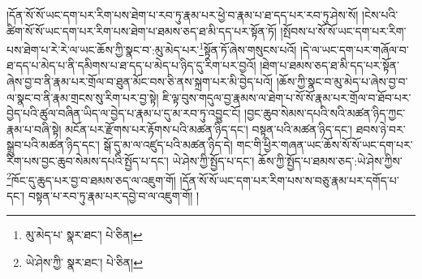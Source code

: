 །དོན་སོ་སོ་ཡང་དག་པར་རིག་པས་ཐེག་པ་རབ་ཏུ་རྣམ་པར་ཕྱེ་བ་རྣམ་པ་ཐ་དད་པར་རབ་ཏུ་ཤེས་སོ། །ངེས་པའི་ཚིག་སོ་སོ་ཡང་དག་པར་རིག་པས་ཐེག་པ་ཐམས་ཅད་ཐ་མི་དད་པར་སྟོན་ཏོ། །སྤོབས་པ་སོ་སོ་ཡང་དག་པར་རིག་པས་ཐེག་པ་རེ་རེ་ལ་ཡང་ཆོས་ཀྱི་སྣང་བ་:མུ་མེད་པར་\footnote{མུ་མེད་པ་  སྣར་ཐང་།  པེ་ཅིན། }སྟོན་ཏོ་ཞེས་གསུངས་པའོ། །དེ་ལ་ཡང་དག་པར་གཞོལ་བ་ཐ་དད་པ་མེད་པ་ནི་དམིགས་པ་ཐ་དད་པ་མེད་པ་ཉིད་དུ་རིག་པར་བྱའོ། །ཐེག་པ་ཐམས་ཅད་ཐ་མི་དད་པར་སྟོན་ཞེས་བྱ་བ་ནི་རྣམ་པར་གྲོལ་བ་ཐུན་མོང་བས་ཅི་ནས་སྐྲག་པར་མི་བྱེད་པའོ། །ཆོས་ཀྱི་སྣང་བ་མུ་མེད་པ་ཞེས་བྱ་བ་ལ་སྣང་བ་ནི་རྣམ་གྲངས་སུ་རིག་པར་བྱ་སྟེ། ཇི་ལྟ་བུས་གདུལ་བྱ་རྣམས་ལ་ཐེག་པ་སོ་སོ་རྣམ་པར་གྲོལ་བ་ཐོབ་པར་བྱེད་པའི་ཚུལ་བཞིན་ཡིད་ལ་བྱེད་པ་རྣམ་པ་དུ་མ་རབ་ཏུ་འབྱུང་ངོ། །བྱང་ཆུབ་སེམས་དཔའི་སའི་མཚན་ཉིད་ཀྱང་རྣམ་པ་བཞི་སྟེ། མངོན་པར་རྫོགས་པར་རྟོགས་པའི་མཚན་ཉིད་དང་། བསྟན་པའི་མཚན་ཉིད་དང་། ཐབས་ཉེ་བར་སྒྲུབ་པའི་མཚན་ཉིད་དང་། སྒོ་དུ་མ་ལ་འཛུད་པའི་མཚན་ཉིད་དེ། གང་གི་ཕྱིར་གཞན་ཡང་ཆོས་སོ་སོ་ཡང་དག་པར་རིག་པས་བྱང་ཆུབ་སེམས་དཔའི་སྤྱོད་པ་དང་། ཡེ་ཤེས་ཀྱི་སྤྱོད་པ་དང་། ཆོས་ཀྱི་སྤྱོད་པ་ཐམས་ཅད་:ཡེ་ཤེས་ཀྱིས་\footnote{ཡེ་ཤེས་ཀྱི་  སྣར་ཐང་།  པེ་ཅིན། }ཁོང་དུ་ཆུད་པར་བྱ་བ་ཐམས་ཅད་ལ་འཇུག་གོ། །དོན་སོ་སོ་ཡང་དག་པར་རིག་པས་ས་བཅུ་རྣམ་པར་དགོད་པ་དང་། བསྟན་པ་རབ་ཏུ་རྣམ་པར་དབྱེ་བ་ལ་འཇུག་གོ། །
